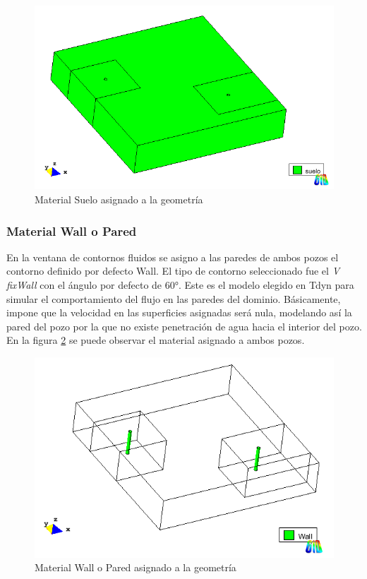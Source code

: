 \documentclass[10pt,a4paper,final]{article}
\begin{document}
\begin{figure}[tbhp]
\centerline{\includegraphics[scale=0.75]{img/datos_materiales_suelo_vista}}
\caption{Material Suelo asignado a la geometría}
\label{datos_materiales_suelo_vista}
\end{figure}
\subsubsection{Material Wall o Pared}
En la ventana de contornos fluidos se asigno a las paredes de ambos pozos el contorno definido por defecto Wall. El tipo de contorno seleccionado fue el \emph{V fixWall} con el ángulo por defecto de $60°$. Este es el modelo elegido en Tdyn para simular el comportamiento del flujo en las paredes del dominio. Básicamente, impone que la velocidad en las superficies asignadas será nula, modelando así la pared del pozo por la que no existe penetración de agua hacia el interior del pozo. En la figura \ref{datos_contornos_fluidos_vista} se puede observar el material asignado a ambos pozos.
\begin{figure}[tbhp]
\centerline{\includegraphics[scale=0.75]{img/datos_contornos_fluidos_vista}}
\caption{Material Wall o Pared asignado a la geometría}
\label{datos_contornos_fluidos_vista}
\end{figure}
\end{document}
